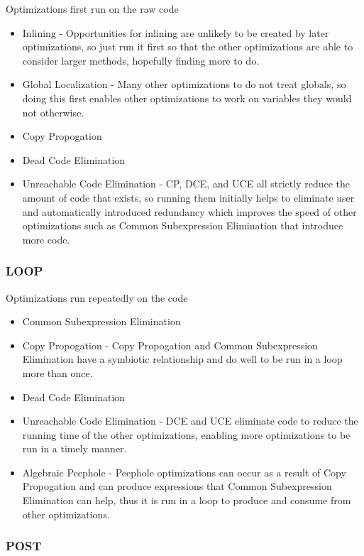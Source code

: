 \documentclass[11pt]{article}
\begin{document}
  Optimizations first run on the raw code

\begin{itemize}
\item Inlining - Opportunities for inlining are unlikely to be created by later optimizations, so just run it first so that the other optimizations are able to consider larger methods, hopefully finding more to do.
\item Global Localization - Many other optimizations to do not treat globals, so doing this first enables other optimizations to work on variables they would not otherwise.
\item Copy Propogation
\item Dead Code Elimination
\item Unreachable Code Elimination - CP, DCE, and UCE all strictly reduce the amount of code that exists, so running them initially helps to eliminate user and automatically introduced redundancy which improves the speed of other optimizations such as Common Subexpression Elimination that introduce more code.
\end{itemize}
\subsubsection{LOOP}
\label{sec-2.11.2}

  Optimizations run repeatedly on the code

\begin{itemize}
\item Common Subexpression Elimination
\item Copy Propogation - Copy Propogation and Common Subexpression Elimination have a symbiotic relationship and
                       do well to be run in a loop more than once.
\item Dead Code Elimination
\item Unreachable Code Elimination - DCE and UCE eliminate code to reduce the running time of the other optimizations,
                                   enabling more optimizations to be run in a timely manner.
\item Algebraic Peephole - Peephole optimizations can occur as a result of Copy Propogation and can produce expressions that Common Subexpression Elimination can help,
                         thus it is run in a loop to produce and consume from other optimizations.
\end{itemize}
\subsubsection{POST}
\label{sec-2.11.3}
\end{document}
